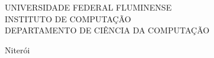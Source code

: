 
\thispagestyle{empty}
\begin{center}
  \begin{singlespace}
    UNIVERSIDADE FEDERAL FLUMINENSE\\
    INSTITUTO DE COMPUTAÇÃO\\
    DEPARTAMENTO DE CIÊNCIA DA COMPUTAÇÃO
  \end{singlespace}

  \vspace{2.6cm}
  \MakeUppercase{\autor}

  \vspace{5.2cm}
  \begin{singlespace}
    \MakeUppercase{\titulo}
  \end{singlespace}
\end{center}

\vspace{2.2cm}
\hfill
\begin{minipage}{0.55\textwidth}
  \singlespacing
  \natureza
\end{minipage}

\vfill
\begin{center}
  {\large Niterói\\ \anoentrega}
\end{center}
\clearpage

\thispagestyle{empty}
\begin{center}
  \MakeUppercase{\autor}

  \vspace{3.8cm}
  \begin{singlespace}
    \MakeUppercase{\titulo}
  \end{singlespace}
\end{center}

\vspace{1.4cm}
\hfill
\begin{minipage}{0.55\textwidth}
  \singlespacing
  \natureza
\end{minipage}

